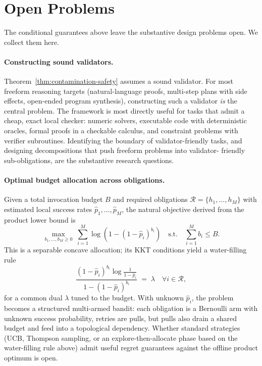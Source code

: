 \documentclass[11pt]{article}
\begin{document}
\section{Open Problems}
\label{sec:open-problems}

The conditional guarantees above leave the substantive design problems open.
We collect them here.

\paragraph{Constructing sound validators.}
Theorem~\ref{thm:contamination-safety} assumes a sound validator. For most freeform reasoning targets
(natural-language proofs, multi-step plans with side effects, open-ended
program synthesis), constructing such a validator \emph{is} the central
problem. The framework is most directly useful for tasks that admit a cheap,
exact local checker: numeric solvers, executable code with deterministic
oracles, formal proofs in a checkable calculus, and constraint problems with
verifier subroutines. Identifying the boundary of validator-friendly tasks,
and designing decompositions that push freeform problems into validator-
friendly sub-obligations, are the substantive research questions.

\paragraph{Optimal budget allocation across obligations.}
Given a total invocation budget $B$ and required obligations
$\mathcal{R}=\{h_1,\dots,h_M\}$ with estimated local success rates
$\hat p_1,\dots,\hat p_M$, the natural objective derived from the product
lower bound is
\[
\max_{b_1,\dots,b_M\ge 0}
\;
\sum_{i=1}^{M}\log\!\left(1-(1-\hat p_i)^{b_i}\right)
\quad\text{s.t.}\quad
\sum_{i=1}^{M} b_i \le B.
\]
This is a separable concave allocation; its KKT conditions yield a
water-filling rule
\[
\frac{(1-\hat p_i)^{b_i}\log\frac{1}{1-\hat p_i}}
     {1-(1-\hat p_i)^{b_i}}
\;=\;
\lambda
\quad\forall i\in\mathcal{R},
\]
for a common dual $\lambda$ tuned to the budget. With unknown $\hat p_i$, the
problem becomes a structured multi-armed bandit: each obligation is a
Bernoulli arm with unknown success probability, retries are pulls, but pulls
also drain a shared budget and feed into a topological dependency. Whether
standard strategies (UCB, Thompson sampling, or an explore-then-allocate
phase based on the water-filling rule above) admit useful regret guarantees
against the offline product optimum is open.
\end{document}

